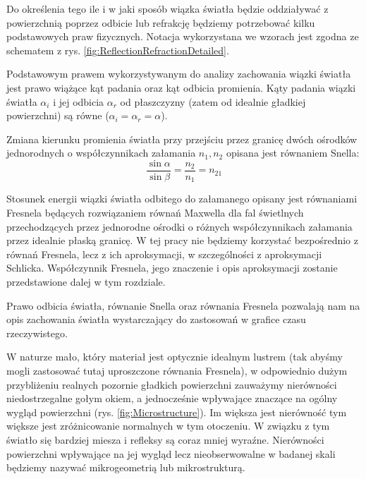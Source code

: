\documentclass[../main.tex]{subfiles}
\begin{document}
Do określenia tego ile i w jaki sposób wiązka światła będzie oddziaływać z powierzchnią poprzez odbicie lub refrakcję będziemy potrzebować kilku podstawowych praw fizycznych. Notacja wykorzystana we wzorach jest zgodna ze schematem z rys. \ref{fig:ReflectionRefractionDetailed}.

Podstawowym prawem wykorzystywanym do analizy zachowania wiązki światła jest prawo wiążące kąt padania oraz kąt odbicia promienia. Kąty padania wiązki światła $\alpha_i$ i jej odbicia $\alpha_r$ od płaszczyzny (zatem od idealnie gładkiej powierzchni) są równe ($\alpha_i = \alpha_r = \alpha$).


Zmiana kierunku promienia światła przy przejściu przez granicę dwóch ośrodków jednorodnych o współczynnikach załamania $n_1, n_2$ opisana jest równaniem Snella:
\[
\frac{\sin\alpha}{\sin\beta} =
  \frac{n_2}{n_1} = n_{21}
\]

Stosunek energii wiązki światła odbitego do załamanego opisany jest równaniami Fresnela będących rozwiązaniem równań Maxwella dla fal świetlnych przechodzących przez jednorodne ośrodki o różnych współczynnikach załamania przez idealnie płaską granicę. W tej pracy nie będziemy korzystać bezpośrednio z równań Fresnela, lecz z ich aproksymacji, w szczególności z aproksymacji Schlicka. Współczynnik Fresnela, jego znaczenie i opis aproksymacji zostanie przedstawione dalej w tym rozdziale.

Prawo odbicia światła, równanie Snella oraz równania Fresnela pozwalają nam na opis zachowania światła wystarczający do zastosowań w grafice czasu rzeczywistego.

W naturze mało, który materiał jest optycznie idealnym lustrem (tak abyśmy mogli zastosować tutaj uproszczone równania Fresnela), w odpowiednio dużym przybliżeniu realnych pozornie gładkich powierzchni zauważymy nierówności niedostrzegalne gołym okiem, a jednocześnie wpływające znaczące na ogólny wygląd powierzchni (rys. \ref{fig:Microstructure}). Im większa jest nierówność tym większe jest zróżnicowanie normalnych w tym otoczeniu. W związku z tym światło się bardziej miesza i refleksy są coraz mniej wyraźne. Nierówności powierzchni wpływające na jej wygląd lecz nieobserwowalne w badanej skali będziemy nazywać mikrogeometrią lub mikrostrukturą.
\end{document}
